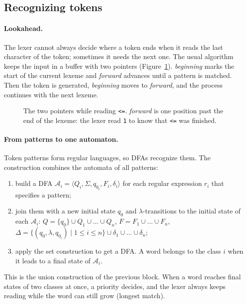 \subsection{Recognizing tokens}

\paragraph{Lookahead.} The lexer cannot always decide where a token ends when it
reads the last character of the token; sometimes it needs the next one. The
usual algorithm keeps the input in a buffer with two pointers
(Figure~\ref{fig:buffer}). \textit{beginning} marks the start of the current
lexeme and \textit{forward} advances until a pattern is matched. Then the token
is generated, \textit{beginning} moves to \textit{forward}, and the process
continues with the next lexeme.

\begin{figure}[h]
\centering
{}
\caption{The two pointers while reading \texttt{<=}. \textit{forward} is one position past the end of the lexeme: the lexer read \texttt{1} to know that \texttt{<=} was finished.}
\label{fig:buffer}
\end{figure}

\paragraph{From patterns to one automaton.} Token patterns form regular
languages, so DFAs recognize them. The construction combines the automata of
all patterns:
\begin{enumerate}
  \item build a DFA $\mathcal{A}_i = \langle Q_i, \Sigma, q_{0_i}, F_i, \delta_i \rangle$ for
    each regular expression $r_i$ that specifies a pattern;
  \item join them with a new initial state $q_0$ and $\lambda$-transitions to the
    initial state of each $\mathcal{A}_i$: $Q = \{q_0\} \cup Q_1 \cup \dots \cup Q_n$,
    $F = F_1 \cup \dots \cup F_n$, $\Delta = \{(q_0, \lambda, q_{0_i}) \mid 1 \le i \le n\}
    \cup \delta_1 \cup \dots \cup \delta_n$;
  \item apply the set construction to get a DFA. A word belongs to the class
    $i$ when it leads to a final state of $\mathcal{A}_i$.
\end{enumerate}
This is the union construction of the previous block. When a word reaches
final states of two classes at once, a priority decides, and the lexer always
keeps reading while the word can still grow (longest match).

